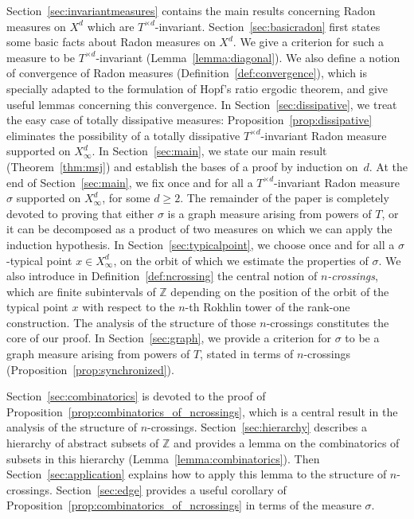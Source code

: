 \documentclass[10pt]{amsart}
\theoremstyle{definition}\newtheorem{defi}[theo]{Definition}\newtheorem{rema}[theo]{Remark}\newtheorem{exam}[theo]{Example}\newtheorem{exem}[theo]{Example}\newtheorem{nota}[theo]{Notation}
\newcommand{\ZZ}{\mathbb{Z}}
\newcommand{\td}{T^{\times d}}
\begin{document}
Section~\ref{sec:invariantmeasures} contains the main results concerning Radon measures on $X^d$ which are $\td$-invariant. Section~\ref{sec:basicradon} first states some basic facts about Radon measures on $X^d$. We give a criterion for such a measure to be $\td$-invariant (Lemma~\ref{lemma:diagonal}). We also define a notion of convergence of Radon measures (Definition~\ref{def:convergence}), which is specially adapted to the formulation of Hopf's ratio ergodic theorem, and give useful lemmas concerning this convergence. In Section~\ref{sec:dissipative}, we treat the easy case of totally dissipative measures: Proposition~\ref{prop:dissipative} eliminates the possibility of a totally dissipative $\td$-invariant Radon measure supported on $X_\infty^d$. In Section~\ref{sec:main}, we state our main result (Theorem~\ref{thm:msj}) and establish the bases of a proof by induction on~$d$. At the end of Section~\ref{sec:main}, we fix once and for all a $\td$-invariant Radon measure $\sigma$ supported on $X_\infty^d$, for some $d\ge2$. The remainder of the paper is completely devoted to proving that either $\sigma$ is a graph measure arising from powers of $T$, or it can be decomposed as a product of two measures on which we can apply the induction hypothesis. In Section~\ref{sec:typicalpoint}, we choose once and for all a $\sigma$-typical point $x\in X_\infty^d$, on the orbit of which we estimate the properties of $\sigma$. We also introduce in Definition~\ref{def:ncrossing} the central notion of \emph{$n$-crossings}, which are finite subintervals of $\ZZ$ depending on the position of the orbit of the typical point $x$ with respect to the $n$-th Rokhlin tower of the rank-one construction. The analysis of the structure of those $n$-crossings constitutes the core of our proof. In Section~\ref{sec:graph}, we provide a criterion for $\sigma$ to be a graph measure arising from powers of $T$, stated in terms of $n$-crossings (Proposition~\ref{prop:synchronized}).

Section~\ref{sec:combinatorics} is devoted to the proof of Proposition~\ref{prop:combinatorics_of_ncrossings}, which is a central result in the analysis of the structure of $n$-crossings. Section~\ref{sec:hierarchy} describes a hierarchy of abstract subsets of $\ZZ$ and provides a lemma on the combinatorics of subsets in this hierarchy (Lemma~\ref{lemma:combinatorics}). Then Section~\ref{sec:application} explains how to apply this lemma to the structure of $n$-crossings. Section~\ref{sec:edge} provides a useful corollary of Proposition~\ref{prop:combinatorics_of_ncrossings} in terms of the measure $\sigma$.
\end{document}

